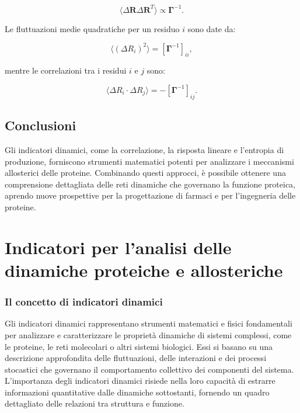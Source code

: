\documentclass[Lau,binding=0.6cm,oneside,noexaminfo]{sapthesis}
\begin{document}
\begin{equation}
\langle \Delta \mathbf{R} \Delta \mathbf{R}^T \rangle \propto \mathbf{\Gamma}^{-1}.
\end{equation}

Le fluttuazioni medie quadratiche per un residuo $i$ sono date da:

\begin{equation}
\langle (\Delta R_i)^2 \rangle = \left[ \mathbf{\Gamma}^{-1} \right]_{ii},
\end{equation}

mentre le correlazioni tra i residui $i$ e $j$ sono:

\begin{equation}
\langle \Delta R_i \cdot \Delta R_j \rangle = -\left[ \mathbf{\Gamma}^{-1} \right]_{ij}.
\end{equation}
\section{Conclusioni}
Gli indicatori dinamici, come la correlazione, la risposta lineare e l’entropia di produzione, forniscono strumenti matematici potenti per analizzare i meccanismi allosterici delle proteine. Combinando questi approcci, è possibile ottenere una comprensione dettagliata delle reti dinamiche che governano la funzione proteica, aprendo nuove prospettive per la progettazione di farmaci e per l'ingegneria delle proteine.


\chapter{Indicatori per l'analisi delle dinamiche proteiche e allosteriche}
\subsection{Il concetto di indicatori dinamici}

Gli indicatori dinamici rappresentano strumenti matematici e fisici fondamentali per analizzare e caratterizzare le proprietà dinamiche di sistemi complessi, come le proteine, le reti molecolari o altri sistemi biologici. Essi si basano su una descrizione approfondita delle fluttuazioni, delle interazioni e dei processi stocastici che governano il comportamento collettivo dei componenti del sistema. L'importanza degli indicatori dinamici risiede nella loro capacità di estrarre informazioni quantitative dalle dinamiche sottostanti, fornendo un quadro dettagliato delle relazioni tra struttura e funzione.
\end{document}
